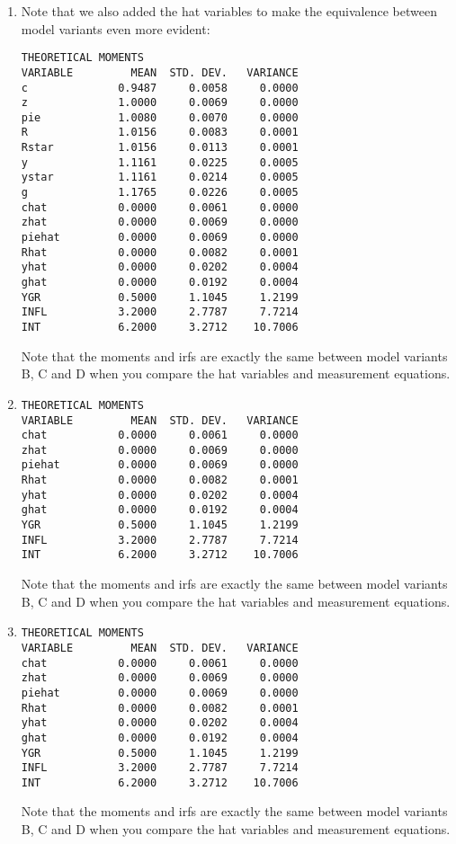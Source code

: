 \begin{enumerate}
\item Note that we also added the hat variables to make the equivalence between model variants even more evident:

\begin{verbatim}
THEORETICAL MOMENTS
VARIABLE         MEAN  STD. DEV.   VARIANCE
c              0.9487     0.0058     0.0000
z              1.0000     0.0069     0.0000
pie            1.0080     0.0070     0.0000
R              1.0156     0.0083     0.0001
Rstar          1.0156     0.0113     0.0001
y              1.1161     0.0225     0.0005
ystar          1.1161     0.0214     0.0005
g              1.1765     0.0226     0.0005
chat           0.0000     0.0061     0.0000
zhat           0.0000     0.0069     0.0000
piehat         0.0000     0.0069     0.0000
Rhat           0.0000     0.0082     0.0001
yhat           0.0000     0.0202     0.0004
ghat           0.0000     0.0192     0.0004
YGR            0.5000     1.1045     1.2199
INFL           3.2000     2.7787     7.7214
INT            6.2000     3.2712    10.7006	
\end{verbatim}
Note that the moments and irfs are exactly the same between model variants B, C and D when you compare the hat variables and measurement equations.

\item 

\begin{verbatim}
THEORETICAL MOMENTS
VARIABLE         MEAN  STD. DEV.   VARIANCE
chat           0.0000     0.0061     0.0000
zhat           0.0000     0.0069     0.0000
piehat         0.0000     0.0069     0.0000
Rhat           0.0000     0.0082     0.0001
yhat           0.0000     0.0202     0.0004
ghat           0.0000     0.0192     0.0004
YGR            0.5000     1.1045     1.2199
INFL           3.2000     2.7787     7.7214
INT            6.2000     3.2712    10.7006	
\end{verbatim}
Note that the moments and irfs are exactly the same between model variants B, C and D when you compare the hat variables and measurement equations.

\item 

\begin{verbatim}
THEORETICAL MOMENTS
VARIABLE         MEAN  STD. DEV.   VARIANCE
chat           0.0000     0.0061     0.0000
zhat           0.0000     0.0069     0.0000
piehat         0.0000     0.0069     0.0000
Rhat           0.0000     0.0082     0.0001
yhat           0.0000     0.0202     0.0004
ghat           0.0000     0.0192     0.0004
YGR            0.5000     1.1045     1.2199
INFL           3.2000     2.7787     7.7214
INT            6.2000     3.2712    10.7006	
\end{verbatim}
Note that the moments and irfs are exactly the same between model variants B, C and D when you compare the hat variables and measurement equations.


\end{enumerate}
